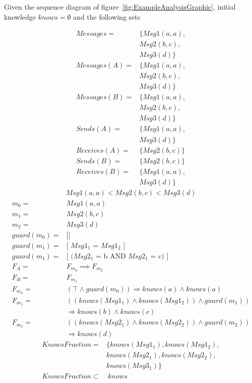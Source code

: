 \documentclass[12pt,journal,compsoc]{IEEEtran}
\newcommand{\knowsname}[0]{knows}
\newcommand{\knows}[1]{\knowsname (#1)}
\begin{document}
Given the sequence diagram of figure~\ref{fig:ExampleAnalysisGraphic}, initial knowledge $knows = \emptyset$ and the following sets
\begin{small}
\begin{align*}
	Messages 	   =	& \{				
				  Msg1(a,a),		\\
				& Msg2(b,c),		\\
				& Msg3(d)		
				  \}				\\
	Messages(A) =	& \{				 
				  Msg1(a,a),		\\
				& Msg2(b,c),		\\
				& Msg3(d)		
				  \}				\\
	Messages(B) =	& \{				 
				  Msg1(a,a),		\\
				& Msg2(b,c),		\\
				& Msg3(d)		
				  \}				\\
  	Sends(A)	   =	& \{				 
				  Msg1(a,a),		\\
				& Msg3(d)		
				  \}				\\
  	Receives(A) =	& \{				 
				  Msg2(b,c)		
				  \}				\\
  	Sends(B)	   =	& \{				 
				  Msg2(b,c)		
				  \}				\\
  	Receives(B) =	& \{				 
				  Msg1(a,a),		\\
				& Msg3(d)		
				  \}				
\end{align*}
\begin{align*}
	Msg1(a,a) < Msg2(b,c) < Msg3(d) 
\end{align*}
\begin{align*}
	m_0			=& Msg1(a,a) 	\\
	m_1			=& Msg2(b,c) 	\\
	m_2 			=& Msg3(d)  	\\
	guard(m_0)	=& \text{[]}														\\
	guard(m_1)	=& \text{[ $Msg1_1$ = $Msg1_2$ ]}									\\
	guard(m_1)	=& \text{[ ($Msg2_1$ = b AND $Msg2_1$ = c) ]}							\\
	F_A 			=& F_{m_0} \implies F_{m_2} 										\\
	F_B 			=& F_{m_1} 														\\
	F_{m_0}		=& (\top \wedge guard(m_0)) \Rightarrow	\knows{a} \wedge \knows{a} 		\\
	F_{m_1}		=& ((\knows{Msg1_1} \wedge \knows{Msg1_2}) \wedge guard(m_1))			\\ 
			 	 & \Rightarrow	 \knows{b} \wedge \knows {c} 						\\
	F_{m_2}		=& ((\knows{Msg2_1} \wedge \knows{Msg2_2}) \wedge guard(m_2))  			\\
			 	 & \Rightarrow	\knows{d} 
\end{align*}
\begin{align*}
	KnowsFraction =& \{ 
	\knows{Msg1_1},
	\knows{Msg1_2}, \\
	& \knows{Msg2_1}, 
	\knows{Msg2_2}, \\
	& \knows{Msg3_1} 
	\}
	\\
	KnowsFraction \subset&\ \knowsname 
\end{align*}
\end{small}
\end{document}
